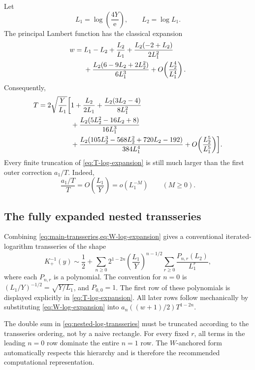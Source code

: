 \documentclass[11pt,oneside]{article}
\theoremstyle{plain}
\theoremstyle{definition}
\theoremstyle{remark}
\newcommand{\e}{\mathrm{e}}
\begin{document}
Let
\begin{equation}
 L_1=\log\!\left(\frac{4Y}{\e}\right),
 \qquad L_2=\log L_1.
 \label{eq:L1-L2}
\end{equation}
The principal Lambert function has the classical expansion
\cite{CorlessEtAl1996,DLMF}
\begin{align}
 w={}&L_1-L_2+\frac{L_2}{L_1}
 +\frac{L_2(-2+L_2)}{2L_1^2}
 \notag\\
 &+\frac{L_2(6-9L_2+2L_2^2)}{6L_1^3}
 +O\!\left(\frac{L_2^4}{L_1^4}\right).
 \label{eq:W-log-expansion}
\end{align}
Consequently,
\begin{align}
 T=2\sqrt{\frac{Y}{L_1}}\biggl[{}&1+\frac{L_2}{2L_1}
 +\frac{L_2(3L_2-4)}{8L_1^2}
 \notag\\
 &+\frac{L_2(5L_2^2-16L_2+8)}{16L_1^3}
 \notag\\
 &+\frac{L_2(105L_2^3-568L_2^2+720L_2-192)}{384L_1^4}
 +O\!\left(\frac{L_2^5}{L_1^5}\right)\biggr].
 \label{eq:T-log-expansion}
\end{align}
Every finite truncation of \cref{eq:T-log-expansion} is still much larger than
the first outer correction \(a_1/T\).  Indeed,
\begin{equation}
 \frac{a_1/T}{T}=O\!\left(\frac{L_1}{Y}\right)
 =o(L_1^{-M})\qquad(M\ge0).
 \label{eq:outer-beyond-slow}
\end{equation}

\subsection{The fully expanded nested transseries}

Combining \cref{eq:main-transseries,eq:W-log-expansion} gives a conventional
iterated-logarithm transseries of the shape
\begin{equation}
 K_+^{-1}(y)
 \sim \frac12+
 \sum_{n\ge0}2^{1-2n}
 \left(\frac{L_1}{Y}\right)^{n-1/2}
 \sum_{r\ge0}\frac{P_{n,r}(L_2)}{L_1^r},
 \label{eq:nested-log-transseries}
\end{equation}
where each \(P_{n,r}\) is a polynomial.  The convention for \(n=0\) is
\((L_1/Y)^{-1/2}=\sqrt{Y/L_1}\), and \(P_{0,0}=1\).  The first row of these
polynomials is displayed explicitly in \cref{eq:T-log-expansion}.  All later
rows follow mechanically by substituting \cref{eq:W-log-expansion} into
\(a_n((w+1)/2)T^{1-2n}\).

\begin{warningbox}
The double sum in \cref{eq:nested-log-transseries} must be truncated according
to the transseries ordering, not by a naive rectangle.  For every fixed
\(r\), all terms in the leading \(n=0\) row dominate the entire \(n=1\) row.
The \(W\)-anchored form automatically respects this hierarchy and is therefore
the recommended computational representation.
\end{warningbox}
\end{document}
